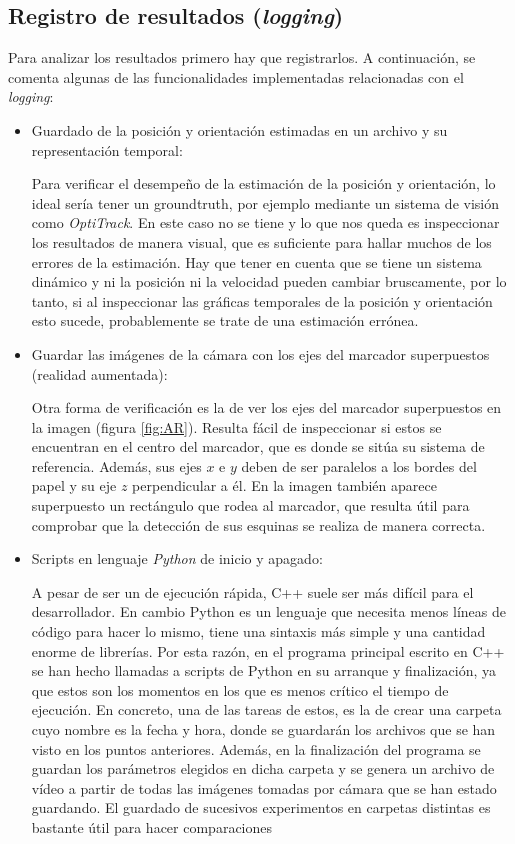 \subsection{Registro de resultados (\textit{logging})}
Para analizar los resultados primero hay que registrarlos.
A continuación, se comenta algunas de las funcionalidades implementadas relacionadas con el \textit{logging}: 
\begin{itemize}
\item Guardado de la posición y orientación estimadas en un archivo y su representación temporal: 

	Para verificar el desempeño de la estimación de la posición y orientación, lo ideal sería tener un groundtruth, por ejemplo mediante un sistema de visión como \textit{OptiTrack}. En este caso no se tiene y lo que nos queda es inspeccionar los resultados de manera visual, que es suficiente para hallar muchos de los errores de la estimación. Hay que tener en cuenta que se tiene un sistema dinámico y ni la posición ni la velocidad pueden cambiar bruscamente, por lo tanto, si al inspeccionar las gráficas temporales de la posición y orientación esto sucede, probablemente se trate de una estimación errónea. 

\item Guardar las imágenes de la cámara con los ejes del marcador superpuestos (realidad aumentada):

	Otra forma de verificación es la de ver los ejes del marcador superpuestos en la imagen (figura \ref{fig:AR}). Resulta fácil de inspeccionar si estos se encuentran en el centro del marcador, que es donde se sitúa su sistema de referencia. Además, sus ejes $x$ e $y$ deben de ser paralelos a los bordes del papel y su eje $z$ perpendicular a él. En la imagen también aparece superpuesto un rectángulo que rodea al marcador, que resulta útil para comprobar que la detección de sus esquinas se realiza de manera correcta.  
	\figAR

\item Scripts en lenguaje \textit{Python} de inicio y apagado:

	A pesar de ser un de ejecución rápida, C++ suele ser más difícil para el desarrollador. En cambio Python es un lenguaje que necesita menos líneas de código para hacer lo mismo, tiene una sintaxis más simple y una cantidad enorme de librerías. 
	Por esta razón, en el programa principal escrito en C++ se han hecho llamadas a scripts de Python en su arranque y finalización, ya que estos son los momentos en los que es menos crítico el tiempo de ejecución. 
	En concreto, una de las tareas de estos, es la de crear una carpeta cuyo nombre es la fecha y hora, donde se guardarán los archivos que se han visto en los puntos anteriores. Además, en la finalización del programa se guardan los parámetros elegidos en dicha carpeta y se genera un archivo de vídeo a partir de todas las imágenes tomadas por cámara que se han estado guardando.
	El guardado de sucesivos experimentos en carpetas distintas es bastante útil para hacer comparaciones
\end{itemize}

